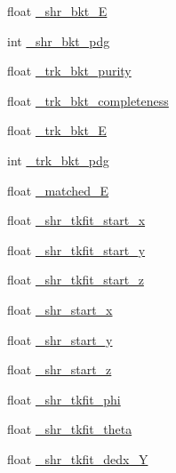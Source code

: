 \begin{DoxyCompactItemize}
\item 
float \hyperlink{classselection_1_1CC0piNpSelection_aa1a21f48d99a4de5f1d444aa3d64dedf}{\-\_\-shr\-\_\-bkt\-\_\-\-E}
\item 
int \hyperlink{classselection_1_1CC0piNpSelection_aab09f93d7cd57031de714956414f3230}{\-\_\-shr\-\_\-bkt\-\_\-pdg}
\item 
float \hyperlink{classselection_1_1CC0piNpSelection_a39a84b873306f200a2350b4804429791}{\-\_\-trk\-\_\-bkt\-\_\-purity}
\item 
float \hyperlink{classselection_1_1CC0piNpSelection_aab22ce289e2d4a109440369e30fddf52}{\-\_\-trk\-\_\-bkt\-\_\-completeness}
\item 
float \hyperlink{classselection_1_1CC0piNpSelection_aa7a6076f1169185e0b2b02fbb03aba22}{\-\_\-trk\-\_\-bkt\-\_\-\-E}
\item 
int \hyperlink{classselection_1_1CC0piNpSelection_a7044de37ee4f3615ffe4bb15e9f00f8e}{\-\_\-trk\-\_\-bkt\-\_\-pdg}
\item 
float \hyperlink{classselection_1_1CC0piNpSelection_ac75aa3ac33061bbdd378594ee7e6e2e5}{\-\_\-matched\-\_\-\-E}
\item 
float \hyperlink{classselection_1_1CC0piNpSelection_a44002e3cc4d16dce6e6f61ee3a2bae6a}{\-\_\-shr\-\_\-tkfit\-\_\-start\-\_\-x}
\item 
float \hyperlink{classselection_1_1CC0piNpSelection_acd1826c44855b71bce92253f7ac1a758}{\-\_\-shr\-\_\-tkfit\-\_\-start\-\_\-y}
\item 
float \hyperlink{classselection_1_1CC0piNpSelection_a4d3591a8bb7abd9e320f35ca3bf311c2}{\-\_\-shr\-\_\-tkfit\-\_\-start\-\_\-z}
\item 
float \hyperlink{classselection_1_1CC0piNpSelection_ac0fb4dbd656f2f3fb2c12ffc02a0df7c}{\-\_\-shr\-\_\-start\-\_\-x}
\item 
float \hyperlink{classselection_1_1CC0piNpSelection_ade6717f479b053a2c2c9082e597d599f}{\-\_\-shr\-\_\-start\-\_\-y}
\item 
float \hyperlink{classselection_1_1CC0piNpSelection_a6e8b4637c8de2991e4d48291d3e90ddf}{\-\_\-shr\-\_\-start\-\_\-z}
\item 
float \hyperlink{classselection_1_1CC0piNpSelection_aefb0bc61c417330a448ababb5363ad8f}{\-\_\-shr\-\_\-tkfit\-\_\-phi}
\item 
float \hyperlink{classselection_1_1CC0piNpSelection_a11df391e482434665c389423bbb9ec5d}{\-\_\-shr\-\_\-tkfit\-\_\-theta}
\item 
float \hyperlink{classselection_1_1CC0piNpSelection_ababbbc32babdef645c2edc613713ceb7}{\-\_\-shr\-\_\-tkfit\-\_\-dedx\-\_\-\-Y}

\end{DoxyCompactItemize}
